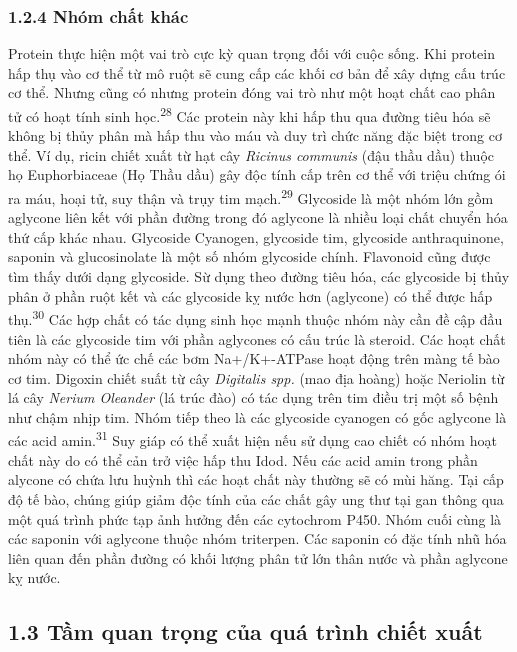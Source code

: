 \documentclass[
  letterpaper,
  DIV=11,
  numbers=noendperiod]{scrartcl}
\begin{document}
\subsubsection{1.2.4 Nhóm chất khác}\label{nhuxf3m-chux1ea5t-khuxe1c}

Protein thực hiện một vai trò cực kỳ quan trọng đối với cuộc sống. Khi
protein hấp thụ vào cơ thể từ mô ruột sẽ cung cấp các khối cơ bản để xây
dựng cấu trúc cơ thể. Nhưng cũng có nhưng protein đóng vai trò như một
hoạt chất cao phân tử có hoạt tính sinh học.\textsuperscript{28} Các
protein này khi hấp thu qua đường tiêu hóa sẽ không bị thủy phân mà hấp
thu vào máu và duy trì chức năng đặc biệt trong cơ thể. Ví dụ, ricin
chiết xuất từ hạt cây \emph{Ricinus communis} (đậu thầu dầu) thuộc họ
Euphorbiaceae (Họ Thầu dầu) gây độc tính cấp trên cơ thể với triệu chứng
ói ra máu, hoại tử, suy thận và trụy tim mạch.\textsuperscript{29}
Glycoside là một nhóm lớn gồm aglycone liên kết với phần đường trong đó
aglycone là nhiều loại chất chuyển hóa thứ cấp khác nhau. Glycoside
Cyanogen, glycoside tim, glycoside anthraquinone, saponin và
glucosinolate là một số nhóm glycoside chính. Flavonoid cũng được tìm
thấy dưới dạng glycoside. Sừ dụng theo đường tiêu hóa, các glycoside bị
thủy phân ở phần ruột kết và các glycoside kỵ nước hơn (aglycone) có thể
được hấp thụ.\textsuperscript{30} Các hợp chất có tác dụng sinh học mạnh
thuộc nhóm này cần đề cập đầu tiên là các glycoside tim với phần
aglycones có cấu trúc là steroid. Các hoạt chất nhóm này có thể ức chế
các bơm Na+/K+-ATPase hoạt động trên màng tế bào cơ tim. Digoxin chiết
suất từ cây \emph{Digitalis spp.} (mao địa hoàng) hoặc Neriolin từ lá
cây \emph{Nerium Oleander} (lá trúc đào) có tác dụng trên tim điều trị
một số bệnh như chậm nhịp tim. Nhóm tiếp theo là các glycoside cyanogen
có gốc aglycone là các acid amin.\textsuperscript{31} Suy giáp có thể
xuất hiện nếu sử dụng cao chiết có nhóm hoạt chất này do có thể cản trở
việc hấp thu Idod. Nếu các acid amin trong phần alycone có chứa lưu
huỳnh thì các hoạt chất này thường sẽ có mùi hăng. Tại cấp độ tế bào,
chúng giúp giảm độc tính của các chất gây ung thư tại gan thông qua một
quá trình phức tạp ảnh hưởng đến các cytochrom P450. Nhóm cuối cùng là
các saponin với aglycone thuộc nhóm triterpen. Các saponin có đặc tính
nhũ hóa liên quan đến phần đường có khối lượng phân tử lớn thân nước và
phần aglycone kỵ nước.

\subsection{1.3 Tầm quan trọng của quá trình chiết
xuất}\label{tux1ea7m-quan-trux1ecdng-cux1ee7a-quuxe1-truxecnh-chiux1ebft-xuux1ea5t}
\end{document}

